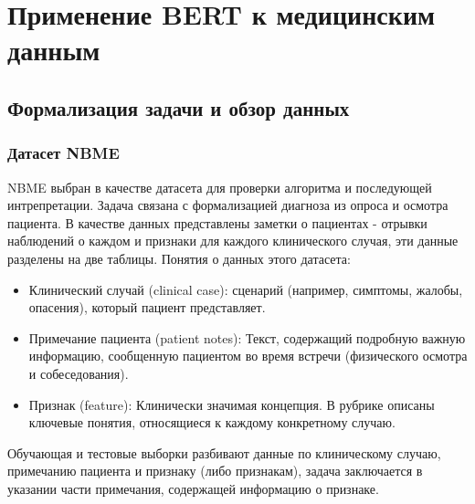 \section{Применение BERT к медицинским данным}
\subsection{Формализация задачи и обзор данных}
\subsubsection{Датасет NBME}
NBME \cite{NBME} выбран в качестве датасета для проверки алгоритма и последующей интрепретации. Задача связана с формализацией диагноза из опроса и осмотра пациента. 
В качестве данных представлены заметки о пациентах - отрывки наблюдений о каждом и признаки для каждого клинического случая, эти данные разделены на две таблицы.
\newline
Понятия о данных этого датасета:
\begin{itemize}
\item Клинический случай (clinical case): сценарий (например, симптомы, жалобы, опасения), который пациент представляет.
\item Примечание пациента (patient notes): Текст, содержащий подробную важную информацию, сообщенную пациентом во время встречи (физического осмотра и собеседования).
\item Признак (feature): Клинически значимая концепция. В рубрике описаны ключевые понятия, относящиеся к каждому конкретному случаю.
\end{itemize}
Обучающая и тестовые выборки разбивают данные по клиническому случаю, примечанию пациента и признаку (либо признакам), задача заключается в указании части примечания, содержащей информацию о признаке. 
